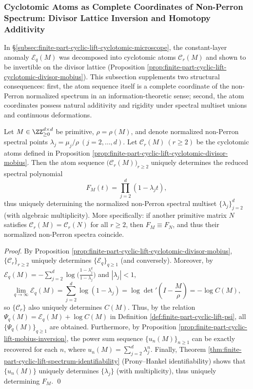 \subsubsection{Cyclotomic Atoms as Complete Coordinates of Non-Perron Spectrum: Divisor Lattice Inversion and Homotopy Additivity}\label{subsubsec:finite-part-cyclotomic-atoms-complete-coordinates}
In \S\ref{subsec:finite-part-cyclic-lift-cyclotomic-microscope}, the constant-layer anomaly \(\mathcal{E}_q(M)\) was decomposed into cyclotomic atoms \(\mathcal{C}_r(M)\) and shown to be invertible on the divisor lattice (Proposition \ref{prop:finite-part-cyclic-lift-cyclotomic-divisor-mobius}).
This subsection supplements two structural consequences: first, the atom sequence itself is a complete coordinate of the non-Perron normalized spectrum in an information-theoretic sense; second, the atom coordinates possess natural additivity and rigidity under spectral multiset unions and continuous deformations.

\begin{theorem}\label{thm:finite-part-cyclotomic-atoms-complete-coordinate}
Let \(M\in\ZZ_{\ge0}^{d\times d}\) be primitive, \(\rho=\rho(M)\), and denote normalized non-Perron spectral points \(\lambda_j=\mu_j/\rho\ (j=2,\dots,d)\).
Let \(\mathcal{C}_r(M)\ (r\ge2)\) be the cyclotomic atoms defined in Proposition \ref{prop:finite-part-cyclic-lift-cyclotomic-divisor-mobius}.
Then the atom sequence \(\bigl(\mathcal{C}_r(M)\bigr)_{r\ge2}\) uniquely determines the reduced spectral polynomial
\[
F_M(t)=\prod_{j=2}^{d}(1-\lambda_j t),
\]
thus uniquely determining the normalized non-Perron spectral multiset \(\{\lambda_j\}_{j=2}^{d}\) (with algebraic multiplicity).
More specifically: if another primitive matrix \(N\) satisfies
\(
\mathcal{C}_r(M)=\mathcal{C}_r(N)
\)
for all \(r\ge2\), then \(F_M\equiv F_N\), and thus their normalized non-Perron spectra coincide.
\end{theorem}
\begin{proof}
By Proposition \ref{prop:finite-part-cyclic-lift-cyclotomic-divisor-mobius}, \(\{\mathcal{C}_r\}_{r\ge2}\) uniquely determines \(\{\mathcal{E}_q\}_{q\ge1}\) (and conversely).
Moreover, by \(\mathcal{E}_q(M)=-\sum_{j=2}^{d}\log\!\bigl(\frac{1-\lambda_j^{q}}{1-\lambda_j}\bigr)\) and \(|\lambda_j|<1\),
\[
\lim_{q\to\infty}\mathcal{E}_q(M)=\sum_{j=2}^{d}\log(1-\lambda_j)=\log\det\nolimits'\!\left(I-\frac{M}{\rho}\right)=-\log C(M),
\]
so \(\{\mathcal{C}_r\}\) also uniquely determines \(C(M)\).
Thus, by the relation \(\Psi_q(M)=\mathcal{E}_q(M)+\log C(M)\) in Definition \ref{def:finite-part-cyclic-lift-psi}, all \(\{\Psi_q(M)\}_{q\ge1}\) are obtained.
Furthermore, by Proposition \ref{prop:finite-part-cyclic-lift-mobius-inversion}, the power sum sequence \(\{u_n(M)\}_{n\ge1}\) can be exactly recovered for each \(n\), where \(u_n(M)=\sum_{j=2}^{d}\lambda_j^{n}\).
Finally, Theorem \ref{thm:finite-part-cyclic-lift-spectrum-identifiability} (Prony--Hankel identifiability) shows that \(\{u_n(M)\}\) uniquely determines \(\{\lambda_j\}\) (with multiplicity), thus uniquely determining \(F_M\). \qed
\end{proof}

